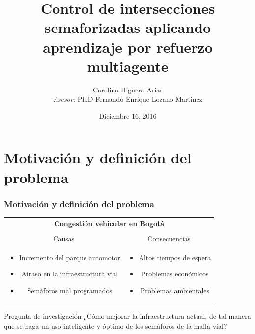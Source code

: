 \documentclass[11pt]{beamer}
\author[Carolina Higuera Arias]{Carolina Higuera Arias\\ \bigskip \textit{Asesor:} Ph.D Fernando Enrique Lozano Martinez}
\title[Control de tránsito con MARL]{Control de intersecciones semaforizadas aplicando aprendizaje por refuerzo multiagente}
\institute[Uniandes] 
{
Universidad de los Andes \\ 
\medskip
}
\date{Diciembre 16, 2016}
\begin{document}
\newenvironment{rcases}
  {\left.\begin{aligned}}
  {\end{aligned}\right\rbrace}

\begin{frame}
\titlepage 
\end{frame}

\section{Motivación y definición del problema}
\begin{frame}
\frametitle{Motivación y definición del problema}
\center
\begin{tabular}{cc}
\multicolumn{2}{c}{\textbf{Congestión vehicular en Bogotá}} \\ & \\
Causas & Consecuencias \\ 
\hline  \hline
\begin{minipage}[t]{0.5\textwidth}
\begin{itemize}
 \item Incremento del parque automotor
 \item Atraso en la infraestructura vial
 \item Semáforos mal programados 
 \end{itemize} 
 \end{minipage}
& 
\begin{minipage}[t]{0.4\textwidth}
 \begin{itemize}
 \item Altos tiempos de espera
 \item Problemas económicos
 \item Problemas ambientales
 \end{itemize} 
 \end{minipage}
\\ 
\end{tabular} 
\bigskip \bigskip
\begin{block}{Pregunta de investigación}
¿Cómo mejorar la infraestructura actual, de tal manera que se haga un uso inteligente y óptimo de los semáforos de la malla vial?
\end{block}
\end{frame}
\end{document}
